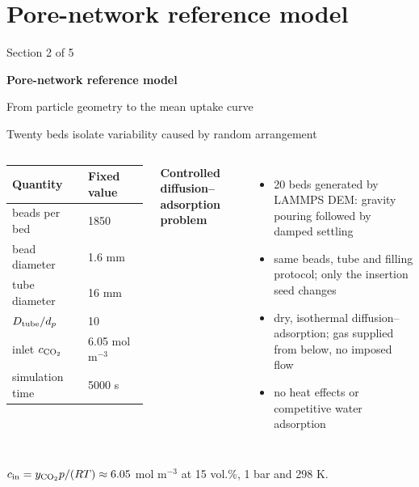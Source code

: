 \documentclass[aspectratio=169,11pt]{beamer}
\newcommand{\hi}[1]{\textcolor{tumblue}{\textbf{#1}}}
\begin{document}
\section[Pore-network model]{Pore-network reference model}

\begin{frame}{}
\vfill
{\large\color{tumgray}Section 2 of 5}\par\vspace{0.4cm}
{\LARGE\color{tumblue}\textbf{Pore-network reference model}}\par\vspace{0.5cm}
{\large From particle geometry to the mean uptake curve}
\vfill
{}
\end{frame}

\begin{frame}{Twenty beds isolate variability caused by random arrangement}
  \begin{columns}[T,onlytextwidth]
    \small
    \begin{tabular}{ll}\toprule
    Quantity & Fixed value\\\midrule
    beads per bed & 1850\\
    bead diameter & 1.6 mm\\
    tube diameter & 16 mm\\
    $D_{\rm tube}/d_p$ & 10\\
    inlet $c_{\rm CO_2}$ & 6.05 mol m$^{-3}$\\
    simulation time & 5000 s\\\bottomrule
    \end{tabular}
    \small
    \hi{Controlled diffusion--adsorption problem}
    \begin{itemize}\setlength{\itemsep}{2pt}
    \item 20 beds generated by LAMMPS DEM: gravity pouring followed by damped settling
    \item same beads, tube and filling protocol; only the insertion seed changes
    \item dry, isothermal diffusion--adsorption; gas supplied from below, no imposed flow
    \item no heat effects or competitive water adsorption
    \end{itemize}
  \end{columns}
  \vspace{0.20cm}
  {\scriptsize\color{tumgray}
  $c_{\rm in}=y_{\rm CO_2}p/(RT)\approx6.05$ mol m$^{-3}$ at 15 vol.\%, 1 bar and 298 K.\\
}
\end{frame}
\end{document}
